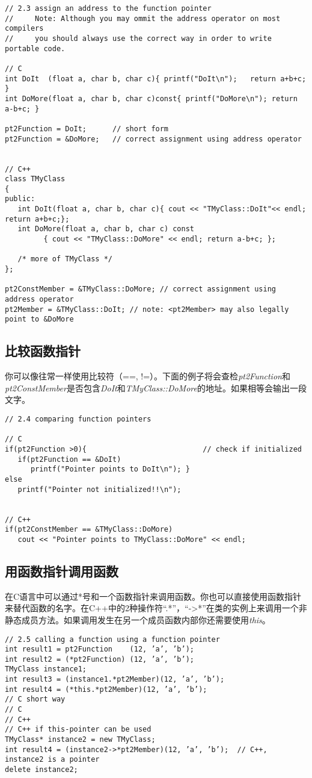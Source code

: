 \documentclass[11pt,a4paper]{article}
\begin{document}
\begin{lstlisting}
// 2.3 assign an address to the function pointer
//     Note: Although you may ommit the address operator on most compilers
//     you should always use the correct way in order to write portable code.

// C
int DoIt  (float a, char b, char c){ printf("DoIt\n");   return a+b+c; }
int DoMore(float a, char b, char c)const{ printf("DoMore\n"); return a-b+c; }

pt2Function = DoIt;      // short form
pt2Function = &DoMore;   // correct assignment using address operator


// C++
class TMyClass
{
public:
   int DoIt(float a, char b, char c){ cout << "TMyClass::DoIt"<< endl; return a+b+c;};
   int DoMore(float a, char b, char c) const
         { cout << "TMyClass::DoMore" << endl; return a-b+c; };

   /* more of TMyClass */
};

pt2ConstMember = &TMyClass::DoMore; // correct assignment using address operator
pt2Member = &TMyClass::DoIt; // note: <pt2Member> may also legally point to &DoMore
\end{lstlisting}

\subsection{比较函数指针}
你可以像往常一样使用比较符（==, !=）。下面的例子将会查检\textit{pt2Function}和\textit{pt2ConstMember}是否包含\textit{DoIt}和\textit{TMyClass::DoMore}的地址。如果相等会输出一段文字。
\begin{lstlisting}
// 2.4 comparing function pointers

// C
if(pt2Function >0){                           // check if initialized
   if(pt2Function == &DoIt)
      printf("Pointer points to DoIt\n"); }
else
   printf("Pointer not initialized!!\n");


// C++
if(pt2ConstMember == &TMyClass::DoMore)
   cout << "Pointer points to TMyClass::DoMore" << endl;
\end{lstlisting}

\subsection{用函数指针调用函数}
在C语言中可以通过*号和一个函数指针来调用函数。你也可以直接使用函数指针来替代函数的名字。在C++中的2种操作符“.*”，“->*”在类的实例上来调用一个非静态成员方法。如果调用发生在另一个成员函数内部你还需要使用\textit{this}。
\begin{lstlisting}
// 2.5 calling a function using a function pointer
int result1 = pt2Function    (12, ’a’, ’b’);
int result2 = (*pt2Function) (12, ’a’, ’b’);
TMyClass instance1;
int result3 = (instance1.*pt2Member)(12, ’a’, ’b’);
int result4 = (*this.*pt2Member)(12, ’a’, ’b’);
// C short way
// C
// C++
// C++ if this-pointer can be used
TMyClass* instance2 = new TMyClass;
int result4 = (instance2->*pt2Member)(12, ’a’, ’b’);  // C++, instance2 is a pointer
delete instance2;
\end{lstlisting}
\end{document}
